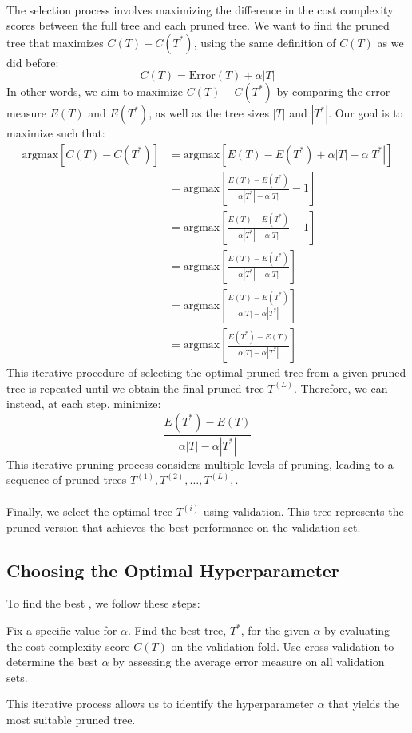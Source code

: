 \documentclass[11pt,a4paper]{report}
\begin{document}
\paragraph{}The selection process involves maximizing the difference in the cost complexity scores between the full tree and each pruned tree. We want to find the pruned tree that maximizes $C(T)-C(T^*)$, using the same definition of $C(T)$ as we did before:
$$C(T)=\textrm{Error}(T)+\alpha|T|$$
In other words, we aim to maximize $C(T)-C(T^*)$ by comparing the error measure $E(T)$ and $E(T^*)$, as well as the tree sizes $|T|$ and $|T^*|$. Our goal is to maximize  such that:
\begin{align*}
\textrm{argmax}\left[C(T)-C(T^*)\right] 
& = \textrm{argmax}\left[E(T)-E(T^*)+\alpha|T|-\alpha|T^*|\right]\\
& = \textrm{argmax}\left[\frac{E(T)-E(T^*)}{\alpha|T^*|-\alpha|T|}-1\right]\\
& = \textrm{argmax}\left[\frac{E(T)-E(T^*)}{\alpha|T^*|-\alpha|T|}-1\right]\\
& = \textrm{argmax}\left[\frac{E(T)-E(T^*)}{\alpha|T^*|-\alpha|T|}\right]\\
& = \textrm{argmax}\left[\frac{E(T)-E(T^*)}{\alpha|T|-\alpha|T^*|}\right]\\
& = \textrm{argmax}\left[\frac{E(T^*)-E(T)}{\alpha|T|-\alpha|T^*|}\right]
\end{align*}
This iterative procedure of selecting the optimal pruned tree from a given pruned tree is repeated until we obtain the final pruned tree $T^{(L)}$. Therefore, we can instead, at each step, minimize:
$$\frac{E(T^*)-E(T)}{\alpha|T|-\alpha|T^*|}$$
This iterative pruning process considers multiple levels of pruning, leading to a sequence of pruned trees $T^{(1)},T^{(2)},\dots,T^{(L)},$.
\paragraph{}Finally, we select the optimal tree $T^{(i)}$ using validation. This tree represents the pruned version that achieves the best performance on the validation set.
\subsection{Choosing the Optimal Hyperparameter}
To find the best , we follow these steps:
\begin{algorithm}[H]
\begin{algorithmic}[1]
   \State Fix a specific value for $\alpha$.
   \State Find the best tree, $T^*$, for the given $\alpha$ by evaluating the cost complexity score $C(T)$ on the validation fold.
	\State Use cross-validation to determine the best $\alpha$ by assessing the average error measure on all validation sets.
\end{algorithmic}
\end{algorithm}
This iterative process allows us to identify the hyperparameter $\alpha$ that yields the most suitable pruned tree.
\end{document}
